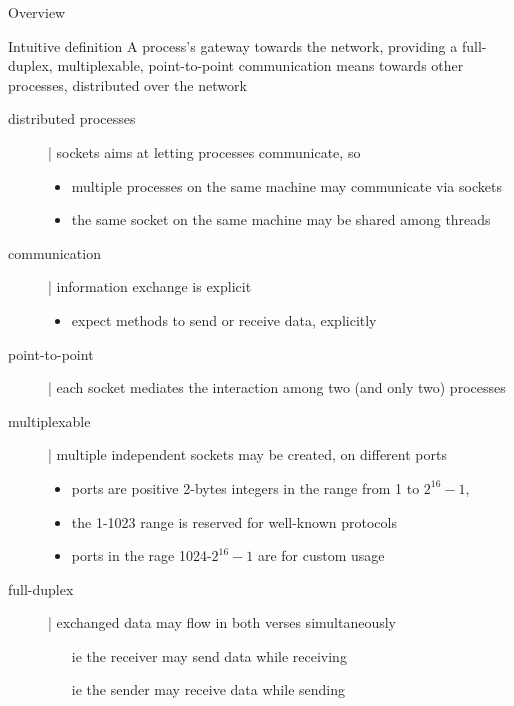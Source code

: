 \documentclass{beamer}\mode<presentation>{\usetheme{AMSBolognaFC}}
\begin{document}
\begin{frame}[c, allowframebreaks]{Overview}
    \begin{block}{Intuitive definition}
        A process's gateway towards the network, providing a full-duplex, multiplexable, point-to-point communication means towards other processes, distributed over the network
    \end{block}

    \begin{description}
        \item[distributed processes] | sockets aims at letting \alert{processes} communicate, so
        \begin{itemize}\small
            \item multiple processes on the same machine may communicate via sockets
            \item the same socket on the same machine may be shared among threads
        \end{itemize}

        \smallskip

        \item[communication] | information exchange is \alert{explicit}
        \begin{itemize}\small
            \item expect methods to send or receive data, explicitly
        \end{itemize}

        \smallskip

        \item[point-to-point] | each socket mediates the interaction among \alert{two (and only two)} processes

        \smallskip

        \item[multiplexable] | multiple independent sockets may be created, on different \alert{ports}
        \begin{itemize}\small
            \item ports are positive 2-bytes integers in the range from 1 to $2^{16}-1$,
            \item the 1-1023 range is reserved for well-known protocols
            \item ports in the rage 1024-$2^{16}-1$ are for custom usage
        \end{itemize}

        \smallskip

        \item[full-duplex] | exchanged data may flow in both verses simultaneously
        \begin{itemize}\small
            \item[ie] the receiver may send data while receiving
            \item[ie] the sender may receive data while sending
        \end{itemize}


\end{description}
\end{frame}
\end{document}
